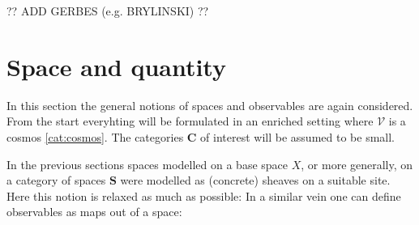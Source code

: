     ?? ADD GERBES (e.g. BRYLINSKI) ??

\section{Space and quantity}

    In this section the general notions of spaces and observables are again considered. From the start everyhting will be formulated in an enriched setting where $\mathcal{V}$ is a cosmos \ref{cat:cosmos}. The categories $\mathbf{C}$ of interest will be assumed to be small.

    In the previous sections spaces modelled on a base space $X$, or more generally, on a category of spaces $\mathbf{S}$ were modelled as (concrete) sheaves on a suitable site. Here this notion is relaxed as much as possible:
    In a similar vein one can define observables as maps out of a space:

